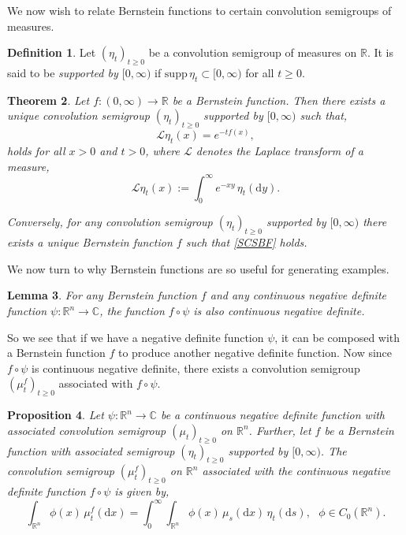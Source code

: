 \documentclass[a4paper, 12pt]{report}
\newtheorem{theorem}{Theorem}[section]
\newtheorem{lemma}[theorem]{Lemma}
\theoremstyle{cor}
\newtheorem{prop}[theorem]{Proposition}
\theoremstyle{remark}
\theoremstyle{definition}
\newtheorem{defn}[theorem]{Definition}
\begin{document}
We now wish to relate Bernstein functions to certain convolution semigroups of measures.
\begin{defn}
Let $(\eta_t)_{t \ge 0}$ be a convolution semigroup of measures on $\mathbb{R}$.  It is said to be \emph{supported by $[0, \infty)$} if $\mathrm{supp}\,\eta_t \subset[0, \infty)$ for all $t \ge 0$.
\end{defn}

\begin{theorem}
Let $f : (0, \infty) \to \mathbb{R}$ be a Bernstein function.  Then there exists a unique convolution semigroup $(\eta_t)_{t \ge 0}$ supported by $[0, \infty)$ such that,
\begin{equation}
\mathcal{L}\eta_t(x) = e^{-tf(x)},\label{SCSBF}
\end{equation}
holds for all $x > 0$ and $t > 0$, where $\mathcal{L}$ denotes the Laplace transform of a measure,
$$
\mathcal{L}\eta_t(x) := \int_0^\infty e^{-xy}\,\eta_t(\mathrm{d}y).
$$

Conversely, for any convolution semigroup $(\eta_t)_{t \ge 0}$ supported by $[0, \infty)$ there exists a unique Bernstein function $f$ such that \eqref{SCSBF} holds.
\end{theorem}

We now turn to why Bernstein functions are so useful for generating examples.
\begin{lemma}
For any Bernstein function $f$ and any continuous negative definite function $\psi : \mathbb{R}^n \to \mathbb{C}$, the function $f \circ \psi$ is also continuous negative definite.
\end{lemma}

So we see that if we have a negative definite function $\psi$, it can be composed with a Bernstein function $f$ to produce another negative definite function.  Now since $f \circ \psi$ is continuous negative definite, there exists a convolution semigroup $(\mu_t^f)_{t \ge 0}$ associated with $f \circ \psi$.
\begin{prop}\label{FTaSBFP2}
Let $\psi : \mathbb{R}^n \to \mathbb{C}$ be a continuous negative definite function with associated convolution semigroup $(\mu_t)_{t \ge 0}$ on $\mathbb{R}^n$.  Further, let $f$ be a Bernstein function with associated semigroup $(\eta_t)_{t \ge 0}$ supported by $[0, \infty)$.  The convolution semigroup $(\mu_t^f)_{t \ge 0}$ on $\mathbb{R}^n$ associated with the continuous negative definite function $f \circ \psi$ is given by,
\begin{equation}
\int_{\mathbb{R}^n}\phi(x)\,\mu_t^f(\mathrm{d}x) = \int_0^\infty\int_{\mathbb{R}^n}\phi(x)\,\mu_s(\mathrm{d}x)\,\eta_t(\mathrm{d}s), \,\,\,\, \phi \in C_0(\mathbb{R}^n).
\end{equation}
\end{prop}
\end{document}
